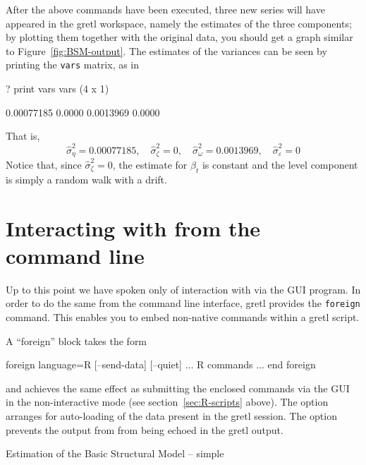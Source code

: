 After the above commands have been executed, three new series will
have appeared in the gretl workspace, namely the estimates of
the three components; by plotting them together with the original
data, you should get a graph similar to
Figure~\ref{fig:BSM-output}. The estimates of the variances can be
seen by printing the \texttt{vars} matrix, as in

\begin{code}
? print vars
vars (4 x 1)

  0.00077185 
      0.0000 
   0.0013969 
      0.0000 
\end{code}

That is,
\begin{equation*}
  \hat{\sigma}^2_{\eta} = 0.00077185, \quad
  \hat{\sigma}^2_{\zeta} = 0, \quad
  \hat{\sigma}^2_{\omega} = 0.0013969, \quad
  \hat{\sigma}^2_{\varepsilon} = 0
\end{equation*}
Notice that, since $\hat{\sigma}^2_{\zeta} = 0$, the estimate for
$\beta_t$ is constant and the level component is simply a random walk
with a drift.

\section{Interacting with  from the command line}
\label{sec:foreign-command}

Up to this point we have spoken only of interaction with  via
the GUI program. In order to do the same from the command line
interface, gretl provides the \texttt{foreign} command. This
enables you to embed non-native commands within a gretl
script.

A ``foreign'' block takes the form
\begin{code}
foreign language=R [--send-data] [--quiet]
    ... R commands ...
end foreign
\end{code}
and achieves the same effect as submitting the enclosed 
commands via the GUI in the non-interactive mode (see
section~\ref{sec:R-scripts} above). The  option
arranges for auto-loading of the data present in the gretl
session.  The  option prevents the output from 
from being echoed in the gretl output.

\begin{script}[htbp]
  \caption{Estimation of the Basic Structural Model -- simple}
\label{RStructTS-simple}
\end{script}

